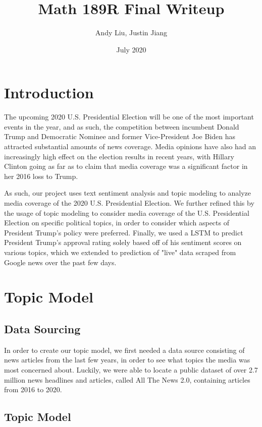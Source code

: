 \documentclass[12pt, letter-paper]{article}
\title{Math 189R Final Writeup}
\author{Andy Liu, Justin Jiang}
\date{July 2020}
\begin{document}
\maketitle

\section{Introduction}

The upcoming 2020 U.S. Presidential Election will be one of the most important events in the year, and as such, the competition between incumbent Donald Trump and Democratic Nominee and former Vice-President Joe Biden has attracted substantial amounts of news coverage. Media opinions have also had an increasingly high effect on the election results in recent years, with Hillary Clinton going as far as to claim that media coverage was a significant factor in her 2016 loss to Trump.

As such, our project uses text sentiment analysis and topic modeling to analyze media coverage of the 2020 U.S. Presidential Election. We further refined this by the usage of topic modeling to consider media coverage of the U.S. Presidential Election on specific political topics, in order to consider which aspects of President Trump's policy were preferred. Finally, we used a LSTM to predict President Trump's approval rating solely based off of his sentiment scores on various topics, which we extended to prediction of "live" data scraped from Google news over the past few days.

\section{Topic Model}

\subsection{Data Sourcing}

In order to create our topic model, we first needed a data source consisting of news articles from the last few years, in order to see what topics the media was most concerned about. Luckily, we were able to locate a public dataset of over 2.7 million news headlines and articles, called All The News 2.0, containing articles from 2016 to 2020. 

\subsection{Topic Model}
\end{document}

